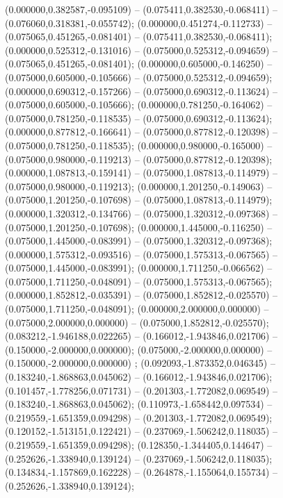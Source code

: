  (0.000000,0.382587,-0.095109) -- (0.075411,0.382530,-0.068411) -- (0.076060,0.318381,-0.055742);
 (0.000000,0.451274,-0.112733) -- (0.075065,0.451265,-0.081401) -- (0.075411,0.382530,-0.068411);
 (0.000000,0.525312,-0.131016) -- (0.075000,0.525312,-0.094659) -- (0.075065,0.451265,-0.081401);
 (0.000000,0.605000,-0.146250) -- (0.075000,0.605000,-0.105666) -- (0.075000,0.525312,-0.094659);
 (0.000000,0.690312,-0.157266) -- (0.075000,0.690312,-0.113624) -- (0.075000,0.605000,-0.105666);
 (0.000000,0.781250,-0.164062) -- (0.075000,0.781250,-0.118535) -- (0.075000,0.690312,-0.113624);
 (0.000000,0.877812,-0.166641) -- (0.075000,0.877812,-0.120398) -- (0.075000,0.781250,-0.118535);
 (0.000000,0.980000,-0.165000) -- (0.075000,0.980000,-0.119213) -- (0.075000,0.877812,-0.120398);
 (0.000000,1.087813,-0.159141) -- (0.075000,1.087813,-0.114979) -- (0.075000,0.980000,-0.119213);
 (0.000000,1.201250,-0.149063) -- (0.075000,1.201250,-0.107698) -- (0.075000,1.087813,-0.114979);
 (0.000000,1.320312,-0.134766) -- (0.075000,1.320312,-0.097368) -- (0.075000,1.201250,-0.107698);
 (0.000000,1.445000,-0.116250) -- (0.075000,1.445000,-0.083991) -- (0.075000,1.320312,-0.097368);
 (0.000000,1.575312,-0.093516) -- (0.075000,1.575313,-0.067565) -- (0.075000,1.445000,-0.083991);
 (0.000000,1.711250,-0.066562) -- (0.075000,1.711250,-0.048091) -- (0.075000,1.575313,-0.067565);
 (0.000000,1.852812,-0.035391) -- (0.075000,1.852812,-0.025570) -- (0.075000,1.711250,-0.048091);
 (0.000000,2.000000,0.000000) -- (0.075000,2.000000,0.000000) -- (0.075000,1.852812,-0.025570);
 (0.083212,-1.946188,0.022265) -- (0.166012,-1.943846,0.021706) -- (0.150000,-2.000000,0.000000);
 (0.075000,-2.000000,0.000000) -- (0.150000,-2.000000,0.000000) ;
 (0.092093,-1.873352,0.046345) -- (0.183240,-1.868863,0.045062) -- (0.166012,-1.943846,0.021706);
 (0.101457,-1.778256,0.071731) -- (0.201303,-1.772082,0.069549) -- (0.183240,-1.868863,0.045062);
 (0.110973,-1.658442,0.097534) -- (0.219559,-1.651359,0.094298) -- (0.201303,-1.772082,0.069549);
 (0.120152,-1.513151,0.122421) -- (0.237069,-1.506242,0.118035) -- (0.219559,-1.651359,0.094298);
 (0.128350,-1.344405,0.144647) -- (0.252626,-1.338940,0.139124) -- (0.237069,-1.506242,0.118035);
 (0.134834,-1.157869,0.162228) -- (0.264878,-1.155064,0.155734) -- (0.252626,-1.338940,0.139124);
